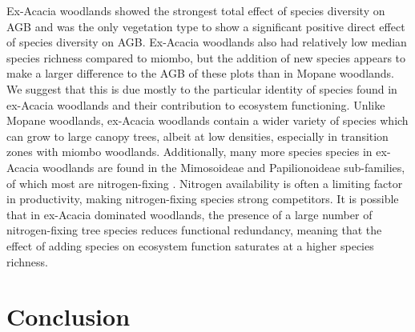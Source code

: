 \begin{refsection}
Ex-Acacia woodlands showed the strongest total effect of species diversity on AGB and was the only vegetation type to show a significant positive direct effect of species diversity on AGB. Ex-Acacia woodlands also had relatively low median species richness compared to miombo, but the addition of new species appears to make a larger difference to the AGB of these plots than in Mopane woodlands. We suggest that this is due mostly to the particular identity of species found in ex-Acacia woodlands and their contribution to ecosystem functioning. Unlike Mopane woodlands, ex-Acacia woodlands contain a wider variety of species which can grow to large canopy trees, albeit at low densities, especially in transition zones with miombo woodlands. Additionally, many more species species in ex-Acacia woodlands are found in the Mimosoideae and Papilionoideae sub-families, of which most are nitrogen-fixing \citep{Tedersoo2018}. Nitrogen availability is often a limiting factor in productivity, making nitrogen-fixing species strong competitors. It is possible that in ex-Acacia dominated woodlands, the presence of a large number of nitrogen-fixing tree species reduces functional redundancy, meaning that the effect of adding species on ecosystem function saturates at a higher species richness.

\section{Conclusion}
\label{befr:sec:conclusion}


\end{refsection}
